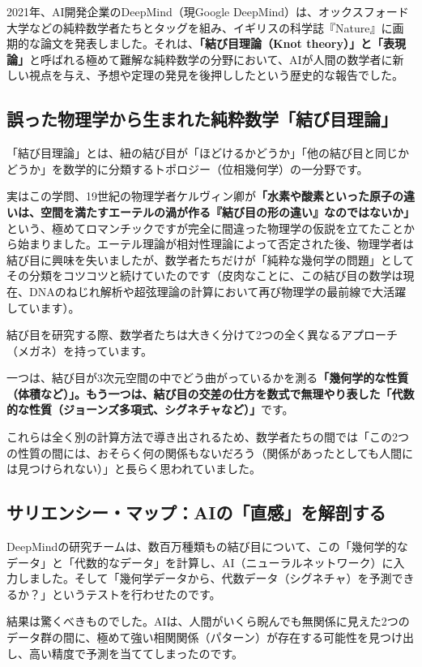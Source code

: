 2021年、AI開発企業のDeepMind（現Google DeepMind）は、オックスフォード大学などの純粋数学者たちとタッグを組み、イギリスの科学誌『Nature』に画期的な論文を発表しました。それは、\textbf{「結び目理論（Knot theory）」と「表現論」}と呼ばれる極めて難解な純粋数学の分野において、AIが人間の数学者に新しい視点を与え、予想や定理の発見を後押ししたという歴史的な報告でした。

\subsection{誤った物理学から生まれた純粋数学「結び目理論」}

「結び目理論」とは、紐の結び目が「ほどけるかどうか」「他の結び目と同じかどうか」を数学的に分類するトポロジー（位相幾何学）の一分野です。

実はこの学問、19世紀の物理学者ケルヴィン卿が\textbf{「水素や酸素といった原子の違いは、空間を満たすエーテルの渦が作る『結び目の形の違い』なのではないか」}という、極めてロマンチックですが完全に間違った物理学の仮説を立てたことから始まりました。エーテル理論が相対性理論によって否定された後、物理学者は結び目に興味を失いましたが、数学者たちだけが「純粋な幾何学の問題」としてその分類をコツコツと続けていたのです（皮肉なことに、この結び目の数学は現在、DNAのねじれ解析や超弦理論の計算において再び物理学の最前線で大活躍しています）。

結び目を研究する際、数学者たちは大きく分けて2つの全く異なるアプローチ（メガネ）を持っています。

一つは、結び目が3次元空間の中でどう曲がっているかを測る\textbf{「幾何学的な性質（体積など）」。もう一つは、結び目の交差の仕方を数式で無理やり表した「代数的な性質（ジョーンズ多項式、シグネチャなど）」}です。

これらは全く別の計算方法で導き出されるため、数学者たちの間では「この2つの性質の間には、おそらく何の関係もないだろう（関係があったとしても人間には見つけられない）」と長らく思われていました。

\subsection{サリエンシー・マップ：AIの「直感」を解剖する}

DeepMindの研究チームは、数百万種類もの結び目について、この「幾何学的なデータ」と「代数的なデータ」を計算し、AI（ニューラルネットワーク）に入力しました。そして「幾何学データから、代数データ（シグネチャ）を予測できるか？」というテストを行わせたのです。

結果は驚くべきものでした。AIは、人間がいくら睨んでも無関係に見えた2つのデータ群の間に、極めて強い相関関係（パターン）が存在する可能性を見つけ出し、高い精度で予測を当ててしまったのです。


